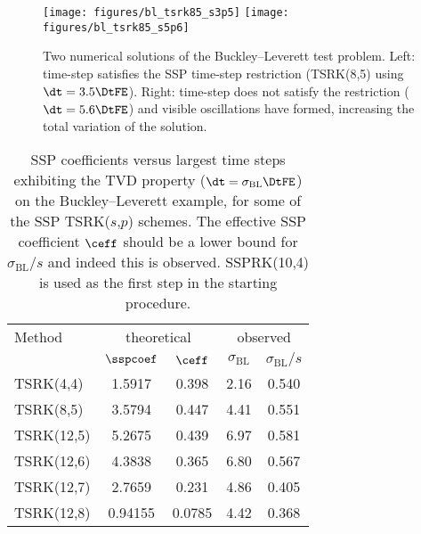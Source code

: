 \begin{figure}
  \centerline{%
  \texttt{[image: figures/bl\_tsrk85\_s3p5]}%
  \texttt{[image: figures/bl\_tsrk85\_s5p6]}%
  }
  \caption{Two numerical solutions of the Buckley--Leverett test
    problem.  Left: time-step satisfies the SSP time-step restriction
    (TSRK(8,5) using $\dt = 3.5\DtFE$).  Right: time-step
    does not satisfy the restriction ($\dt = 5.6\DtFE$) 
    and visible oscillations have formed, increasing the total variation
    of the solution.}
  \label{fig:bucklev}
\end{figure}


\begin{table}
  \caption{SSP coefficients versus largest time steps exhibiting
    the TVD property ($\dt = \sigma_{\text{BL}} \DtFE$) on
    the Buckley--Leverett example, for
    some of the SSP TSRK($s$,$p$) schemes.  The effective SSP
    coefficient $\ceff$ should be a lower bound for
    $\sigma_{\text{BL}} / s$ and indeed this is observed.
    SSPRK(10,4) \cite{Ketcheson2008_article} is used as the first step
    in the starting procedure.}
  \label{tab:bucklev_TVD}
  \center
  \begin{tabular}{l|cc|cc}
    \hline
    Method & \multicolumn{2}{c|}{theoretical} & \multicolumn{2}{c}{observed} \\
                  & $\sspcoef$ & $\ceff$&  $\sigma_{\text{BL}}$  & $\sigma_{\text{BL}} / s$  \\ \hline
      TSRK(4,4)   & 1.5917   &  0.398     &   2.16 &  0.540   \\
      TSRK(8,5)   & 3.5794   &  0.447     &   4.41 &  0.551  \\
      TSRK(12,5)  & 5.2675   &  0.439     &   6.97 &  0.581  \\
      TSRK(12,6)  & 4.3838   &  0.365     &   6.80 &  0.567  \\
      TSRK(12,7)  & 2.7659   &  0.231     &   4.86 &  0.405  \\
      TSRK(12,8)  & 0.94155  &  0.0785    &   4.42 &  0.368  \\
      \hline
  \end{tabular}
\end{table}


